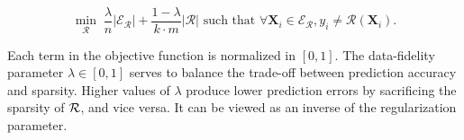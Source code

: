 \[
\min\limits_{\mathcal{R}} \;  \frac{\lambda}{n}|\mathcal{E}_\mathcal{R}| + \frac{1-\lambda}{k\cdot m} |\mathcal{R}|  \text{ such that }\forall \mathbf{X}_i \in \mathcal{E}_\mathcal{R} ,y_i \ne \mathcal{R}(\mathbf{X}_i) .
\]

Each term in the  objective function is normalized in $ [0,1] $. 
The data-fidelity parameter $ \lambda \in [0,1] $  serves to balance
the trade-off between prediction accuracy and sparsity. Higher 
values of $ \lambda $ produce lower prediction errors by sacrificing the sparsity 
of $ {\mathcal{R}} $, and vice versa. It can be viewed as an inverse of the regularization 
parameter. 